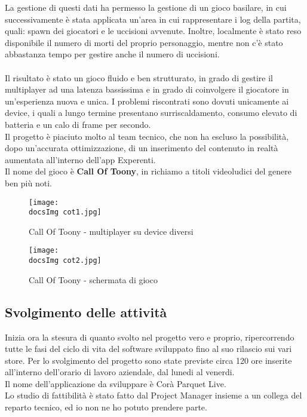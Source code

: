 La gestione di questi dati ha permesso la gestione di un gioco basilare, in cui successivamente \`e stata applicata un'area in cui rappresentare i log della partita, quali: spawn dei giocatori e le uccisioni avvenute. Inoltre, localmente \`e stato reso disponibile il numero di morti del proprio personaggio, mentre non c'\`e stato abbastanza tempo per gestire anche il numero di uccisioni.\\\\
Il risultato \`e stato un gioco fluido e ben strutturato, in grado di gestire il multiplayer ad una latenza bassissima e in grado di coinvolgere il giocatore in un'esperienza nuova e unica. I problemi riscontrati sono dovuti unicamente ai device, i quali a lungo termine presentano surriscaldamento, consumo elevato di batteria e un calo di frame per secondo.\\
Il progetto \`e piaciuto molto al team tecnico, che non ha escluso la possibilit\`a, dopo un'accurata ottimizzazione, di un inserimento del contenuto in realt\`a aumentata all'interno dell'app Experenti.\\
Il nome del gioco \`e \textbf{Call Of Toony}, in richiamo a titoli videoludici del genere ben pi\`u noti.

\begin{figure}[H]
	\centering
	\texttt{[image: \\docsImg cot1.jpg]}
	\caption{Call Of Toony - multiplayer su device diversi}
	\label{fig:Call Of Toony - multiplayer}
\end{figure}

\begin{figure}[H]
	\centering
	\texttt{[image: \\docsImg cot2.jpg]}
	\caption{Call Of Toony - schermata di gioco}
	\label{fig:Call Of Toony - schermata di gioco}
\end{figure}

\subsection{Svolgimento delle attivit\`a}
Inizia ora la stesura di quanto svolto nel progetto vero e proprio, ripercorrendo tutte le fasi del ciclo di vita del software sviluppato fino al suo rilascio sui vari store. Per lo svolgimento del progetto sono state previste circa 120 ore inserite all'interno dell'orario di lavoro aziendale, dal lunedi al venerdi.\\
Il nome dell'applicazione da sviluppare \`e Cor\`a Parquet Live.\\
Lo studio di fattibilit\`a \`e stato fatto dal Project Manager insieme a un collega del reparto tecnico, ed io non ne ho potuto prendere parte.

